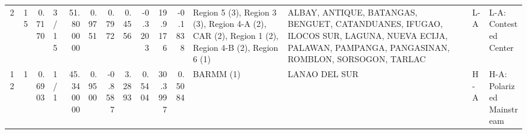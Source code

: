 \begin{tabular}{rrrlrrrrrrrllll}
2 & 15 & {\cellcolor[HTML]{6F92F3}} \color[HTML]{F1F1F1} 0.7170 & 3/15 & {\cellcolor[HTML]{8FB1FE}} \color[HTML]{000000} 51.800000 & 0.9751 & 0.7972 & 0.4556 & -0.3203 & 19.9176 & -0.1838 & Region 5 (3), Region 3 (3), Region 4-A (2), CAR (2), Region 1 (2), Region 4-B (2), Region 6 (1) & ALBAY, ANTIQUE, BATANGAS, BENGUET, CATANDUANES, IFUGAO, ILOCOS SUR, LAGUNA, NUEVA ECIJA, PALAWAN, PAMPANGA, PANGASINAN, ROMBLON, SORSOGON, TARLAC & L-A & L-A: Contested Center \\
12 & 1 & {\cellcolor[HTML]{3B4CC0}} \color[HTML]{F1F1F1} 0.6903 & 1/1 & {\cellcolor[HTML]{3B4CC0}} \color[HTML]{F1F1F1} 45.340000 & 0.9500 & -0.8587 & 3.2893 & 0.5404 & 30.3997 & 0.5084 & BARMM (1) & LANAO DEL SUR & H-A & H-A: Polarized Mainstream \\
\bottomrule
\end{tabular}
